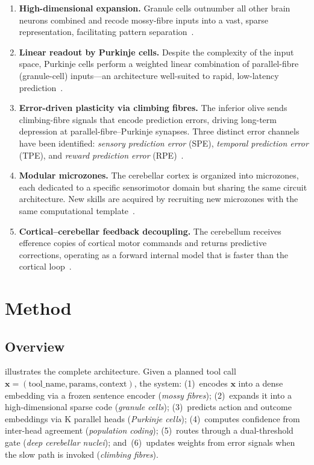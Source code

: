 \documentclass[11pt,a4paper]{article}
\begin{document}
\begin{enumerate}[nosep]
\item \textbf{High-dimensional expansion.}
  Granule cells outnumber all other brain neurons combined and recode mossy-fibre inputs into a vast, sparse representation, facilitating pattern separation~\citep{marr1969theory}.

\item \textbf{Linear readout by Purkinje cells.}
  Despite the complexity of the input space, Purkinje cells perform a weighted linear combination of parallel-fibre (granule-cell) inputs---an architecture well-suited to rapid, low-latency prediction~\citep{albus1971theory}.

\item \textbf{Error-driven plasticity via climbing fibres.}
  The inferior olive sends climbing-fibre signals that encode prediction errors, driving long-term depression at parallel-fibre--Purkinje synapses.
  Three distinct error channels have been identified: \emph{sensory prediction error} (SPE), \emph{temporal prediction error} (TPE), and \emph{reward prediction error} (RPE)~\citep{tsay2025cerebellum}.

\item \textbf{Modular microzones.}
  The cerebellar cortex is organized into microzones, each dedicated to a specific sensorimotor domain but sharing the same circuit architecture.
  New skills are acquired by recruiting new microzones with the same computational template~\citep{apps2005anatomical}.

\item \textbf{Cortical--cerebellar feedback decoupling.}
  The cerebellum receives efference copies of cortical motor commands and returns predictive corrections, operating as a forward internal model that is faster than the cortical loop~\citep{wolpert1998internal}.
\end{enumerate}

\section{Method}\label{sec:method}

\subsection{Overview}

 illustrates the complete architecture.
Given a planned tool call $\mathbf{x} = (\text{tool\_name}, \text{params}, \text{context})$, the system:
(1)~encodes $\mathbf{x}$ into a dense embedding via a frozen sentence encoder (\emph{mossy fibres});
(2)~expands it into a high-dimensional sparse code (\emph{granule cells});
(3)~predicts action and outcome embeddings via K parallel heads (\emph{Purkinje cells});
(4)~computes confidence from inter-head agreement (\emph{population coding});
(5)~routes through a dual-threshold gate (\emph{deep cerebellar nuclei});
and~(6)~updates weights from error signals when the slow path is invoked (\emph{climbing fibres}).
\end{document}
